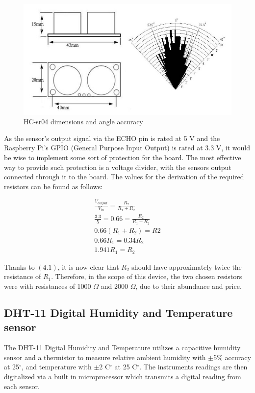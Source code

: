 \documentclass[twoside]{ctuthesis}
\theoremstyle{plain}
\theoremstyle{definition}
\theoremstyle{note}
\begin{document}
\begin{figure}[H]
	\centering
	\includegraphics[scale=0.5]{HCSR04_sizes}
	\caption{HC-sr04 dimensions and angle accuracy \cite{HC-SR04}}
\end{figure}

As the sensor's output signal via the ECHO pin is rated at 5 V \cite{HC-SR04} and the Raspberry Pi's GPIO (General Purpose Input Output) is rated at 3.3 V\cite{RasPi0W}, it would be wise to implement some sort of protection for the board. The most effective way to provide such protection is a voltage divider, with the sensors output connected through it to the board. The values for the derivation of the required resistors can be found as follows:

\begin{gather}\nonumber
	\frac{V_{output}}{V_{in}} = \frac{R_2}{R_1 + R_2}\\\nonumber
	\frac{3.3}{5}= 0.66 = \frac{R_2}{R_1 + R_2}\\\nonumber
	0.66(R_1+R_2) = R2\\\nonumber
	0.66R_1 = 0.34R_2\\
	1.941R_1 = R_2
\end{gather}

Thanks to $(4.1)$, it is now clear that $R_2$ should have approximately twice the resistance of $R_1$. Therefore, in the scope of this device, the two chosen resistors were with resistances of 1000 $\Omega$ and 2000 $\Omega$, due to their abundance and price.


\subsection{DHT-11 Digital Humidity and Temperature sensor}
The DHT-11 Digital Humidity and Temperature utilizes a capacitive humidity sensor and a thermistor to measure relative ambient humidity with $\pm$5$\%$ accuracy at 25$^\circ$, and temperature with $\pm$2 C$^\circ$ at 25 C$^\circ$. The instruments readings are then digitalized via a built in microprocessor which transmits a digital reading from each sensor.
\end{document}
